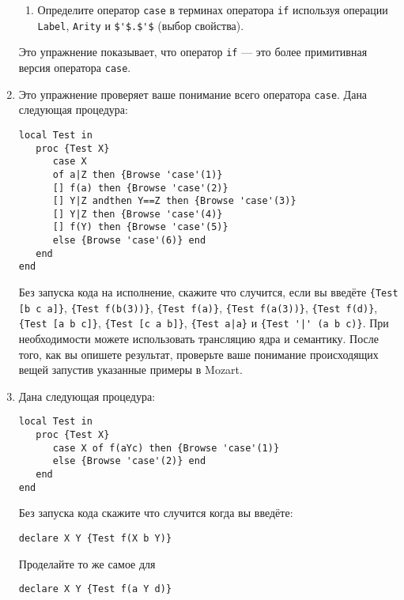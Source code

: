 \begin{enumerate}
{\begin{enumerate}
\item{Определите оператор \lstinline!case! в терминах оператора \lstinline!if! используя операции \lstinline!Label!, \lstinline!Arity! и \lstinline!$'$.$'$! (выбор свойства).}
  \end{enumerate}
  
Это упражнение показывает, что оператор \lstinline!if! --- это более примитивная версия оператора \lstinline!case!.}

\item{Это упражнение проверяет ваше понимание всего оператора \lstinline!case!. Дана следующая процедура:

  \begin{lstlisting}
local Test in
   proc {Test X}
      case X
      of a|Z then {Browse 'case'(1)}
      [] f(a) then {Browse 'case'(2)}
      [] Y|Z andthen Y==Z then {Browse 'case'(3)}
      [] Y|Z then {Browse 'case'(4)}
      [] f(Y) then {Browse 'case'(5)}
      else {Browse 'case'(6)} end
   end
end
  \end{lstlisting}
  
Без запуска кода на исполнение, скажите что случится, если вы введёте \lstinline!{Test [b c a]}!, \lstinline!{Test f(b(3))}!, \lstinline!{Test f(a)}!, \lstinline!{Test f(a(3))}!, \lstinline!{Test f(d)}!, \lstinline!{Test [a b c]}!, \lstinline!{Test [c a b]}!, \lstinline[mathescape=false]!{Test a|a}! и \lstinline[mathescape=false]!{Test '|' (a b c)}!. При необходимости можете использовать трансляцию ядра и семантику. После того, как вы опишете результат, проверьте ваше понимание происходящих вещей запустив указанные примеры в Mozart.}

\item{Дана следующая процедура:

  \begin{lstlisting}
local Test in
   proc {Test X}
      case X of f(aYc) then {Browse 'case'(1)}
      else {Browse 'case'(2)} end
   end
end
  \end{lstlisting}
  
Без запуска кода скажите что случится когда вы введёте:

\begin{lstlisting}
declare X Y {Test f(X b Y)}
\end{lstlisting}

Проделайте то же самое для

\begin{lstlisting}
declare X Y {Test f(a Y d)}
\end{lstlisting}

}
\end{enumerate}
